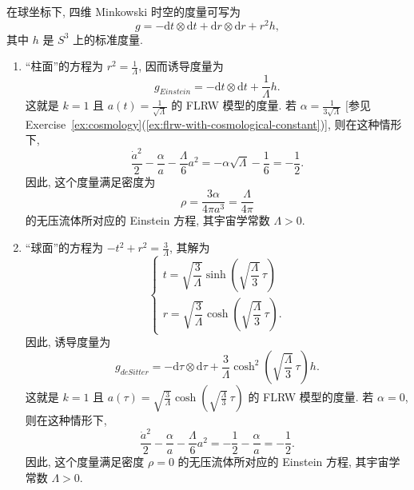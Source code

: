 \begin{description}[font=\normalfont,leftmargin=2em,labelwidth=1.5em]
在球坐标下, 四维 Minkowski 时空的度量可写为
\[
  g=-\mathrm{d}t\otimes\mathrm{d}t+\mathrm{d}r\otimes\mathrm{d}r+r^2h,
\]
其中 $h$ 是 $S^3$ 上的标准度量.
\begin{enumerate}[label=(\alph*),ref=\alph*,leftmargin=*]
\item “柱面”的方程为 $r^2=\frac{1}{\Lambda}$, 因而诱导度量为
\[
  g_{Einstein}=-\mathrm{d}t\otimes\mathrm{d}t+\frac{1}{\Lambda}h.
\]
这就是 $k=1$ 且 $a(t)=\frac{1}{\sqrt{\Lambda}}$ 的 FLRW 模型的度量. 若 $\alpha=\frac{1}{3\sqrt{\Lambda}}$ [参见 Exercise~\ref{ex:cosmology}(\ref{ex:flrw-with-cosmological-constant})], 则在这种情形下,
\[
  \frac{\dot a^2}{2}-\frac{\alpha}{a}-\frac{\Lambda}{6}a^2
    =-\alpha\sqrt{\Lambda}-\frac{1}{6}=-\frac{1}{2}.
\]
因此, 这个度量满足密度为
\[
  \rho=\frac{3\alpha}{4\pi a^3}=\frac{\Lambda}{4\pi}
\]
的无压流体所对应的 Einstein 方程, 其宇宙学常数 $\Lambda>0$.
\item “球面”的方程为 $-t^2+r^2=\frac{3}{\Lambda}$, 其解为
\[
  \begin{cases}
    t=\sqrt{\dfrac{3}{\Lambda}}\sinh\left(\sqrt{\dfrac{\Lambda}{3}}\,\tau\right)\\[.8ex]
    r=\sqrt{\dfrac{3}{\Lambda}}\cosh\left(\sqrt{\dfrac{\Lambda}{3}}\,\tau\right).
  \end{cases}
\]
因此, 诱导度量为
\[
  g_{deSitter}=-\mathrm{d}\tau\otimes\mathrm{d}\tau
     +\frac{3}{\Lambda}\cosh^2\left(\sqrt{\frac{\Lambda}{3}}\,\tau\right)h.
\]
这就是 $k=1$ 且 $a(\tau)=\sqrt{\frac{3}{\Lambda}}\cosh\left(\sqrt{\frac{\Lambda}{3}}\,\tau\right)$ 的 FLRW 模型的度量. 若 $\alpha=0$, 则在这种情形下,
\[
  \frac{\dot a^2}{2}-\frac{\alpha}{a}-\frac{\Lambda}{6}a^2
    =-\frac{1}{2}-\frac{\alpha}{a}=-\frac{1}{2}.
\]
因此, 这个度量满足密度 $\rho=0$ 的无压流体所对应的 Einstein 方程, 其宇宙学常数 $\Lambda>0$.
\end{enumerate}


\end{description}

